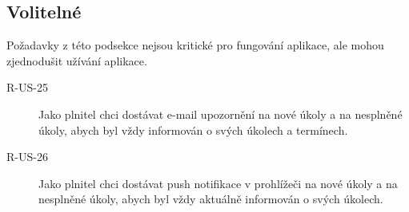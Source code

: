 \subsection{Volitelné}\label{subsec:volitelne}

Požadavky z této podsekce nejsou kritické pro fungování aplikace, ale mohou zjednodušit užívání aplikace.

\begin{description}
    \item[R-US-25]
    Jako plnitel chci dostávat e-mail upozornění na nové úkoly a na nesplněné úkoly, abych byl vždy informován o svých úkolech a termínech.
    \item[R-US-26]
    Jako plnitel chci dostávat push notifikace v prohlížeči na nové úkoly a na nesplněné úkoly, abych byl vždy aktuálně informován o svých úkolech.
\end{description}


